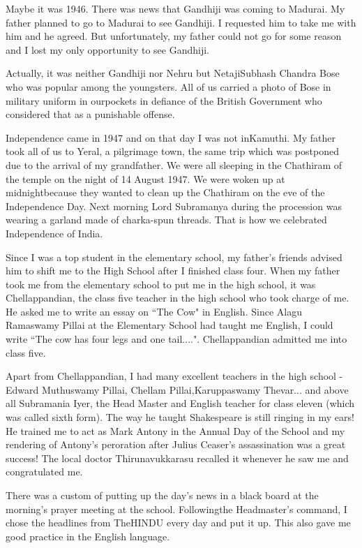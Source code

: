 Maybe it was 1946. There was news that Gandhiji was coming to Madurai. 
My father planned to go to Madurai to see Gandhiji. I requested him to 
take me with him and he agreed. But unfortunately, my father could not 
go for some reason and I lost my only opportunity to see Gandhiji.

Actually, it was neither Gandhiji nor Nehru but Netaji\break Subhash Chandra 
Bose who was popular among the youngsters. All of us carried a photo of 
Bose in military uniform in our\break pockets in defiance of the British 
Government who considered that as a punishable offense.

Independence came in 1947 and on that day I was not in\break Kamuthi. My 
father took all of us to Yeral, a pilgrimage town, the same trip which 
was postponed due to the arrival of my grandfather. We were all sleeping 
in the Chathiram of the temple on the night of 14 August 1947. We were 
woken up at midnight\break because they wanted to clean up the Chathiram on 
the eve of the Independence Day. Next morning Lord Subramanya during the 
procession was wearing a garland made of charka-spun threads. That is 
how we celebrated Independence of India.

Since I was a top student in the elementary school, my father's friends 
advised him to shift me to the High School after I finished class four. 
When my father took me from the elementary school to put me in the high 
school, it was Chellappandian, the class five teacher in the high school 
who took charge of me. He asked me to write an essay on ``The Cow" in 
English. Since Alagu Ramaswamy Pillai at the Elementary School had 
taught me English, I could write ``The cow has four legs and one 
tail....". Chellappandian admitted me into class five.

Apart from Chellappandian, I had many excellent teachers in the high 
school - Edward Muthuswamy Pillai, Chellam Pillai,\break Karuppaswamy 
Thevar... and above all Subramania Iyer, the Head Master and English 
teacher for class eleven (which was called sixth form). The way he 
taught Shakespeare is still ringing in my ears! He trained me to act as 
Mark Antony in the Annual Day of the School and my rendering of Antony's 
peroration after Julius Ceaser's assassination was a great success! The 
local doctor Thirunavukkarasu recalled it whenever he saw me and 
congratulated me.

There was a custom of putting up the day's news in a black board at the 
morning's prayer meeting at the school. Follo\-wing\break the Headmaster's 
command, I chose the headlines from The\break HINDU every day and put it up. 
This also gave me good practice in the English language.

